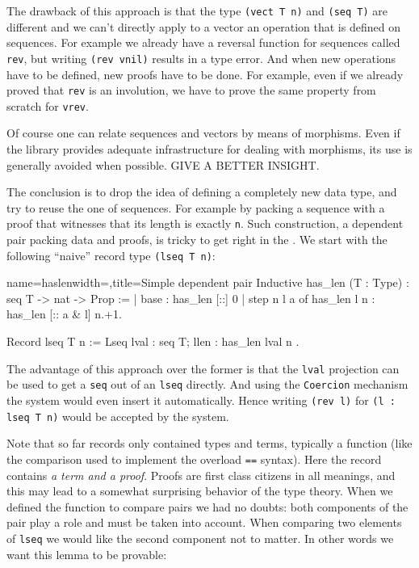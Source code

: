 The drawback of this approach is that the type \lstinline/(vect T n)/
and \lstinline/(seq T)/ are different and we can't directly apply to a
vector an operation that is defined on sequences.  For example we
already have a reversal function for sequences called \lstinline/rev/,
but writing \lstinline/(rev vnil)/ results in a type error.  And when
new operations have to be defined, new proofs have to be done. For
example, even if we already proved that \lstinline/rev/ is an
involution, we have to prove the same property from scratch for
\lstinline/vrev/.

Of course one can relate sequences and vectors by means of
morphisms.  Even if the \mcbMC{} library provides adequate
infrastructure for dealing with morphisms, its use is generally
avoided when possible.  GIVE A BETTER INSIGHT.

The conclusion is to drop the idea of defining a completely new data
type, and try to reuse the one of sequences.  For example by packing a
sequence with a proof that witnesses that its length is exactly
\lstinline/n/.  Such construction, a dependent pair packing data
and proofs, is tricky to get right in the \mcbCIC{}.  We start with
the following ``naive'' record type \lstinline/(lseq T n)/:

\begin{coq}{name=haslen}{width=\textwidth,title=Simple dependent pair}
Inductive has_len (T : Type) : seq T -> nat -> Prop :=
| base : has_len [::] 0
| step n l a of has_len l n : has_len [:: a & l] n.+1.

Record lseq T n := Lseq { lval : seq T; llen : has_len lval n }.
\end{coq}

The advantage of this approach over the former is that the
\lstinline/lval/ projection can be used to get a \lstinline/seq/ out
of an \lstinline/lseq/ directly.  And using the \lstinline/Coercion/
mechanism the system would even insert it automatically.  Hence
writing \lstinline/(rev l)/ for \lstinline/(l : lseq T n)/ would
be accepted by the system.

Note that so far records only contained types and terms, typically
a function (like the comparison used to implement the overload
\lstinline/==/ syntax).  Here the record contains \emph{a term and a proof}.
Proofs are first class citizens in all meanings, and this may lead to
a somewhat surprising behavior of the type theory.
When we defined the function to compare pairs we had no
doubts: both components of the pair play a role and must be taken into
account.  When comparing two elements of \lstinline/lseq/ we would
like the second component not to matter.  In other words we want this
lemma to be provable:

